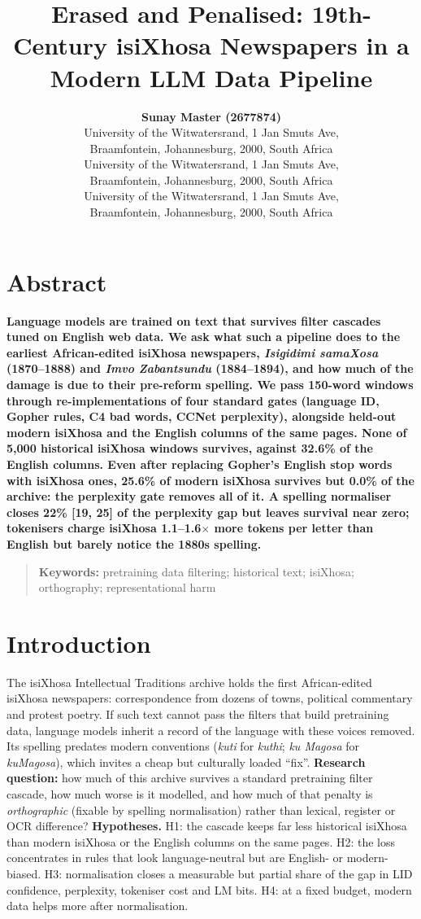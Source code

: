 \documentclass[10pt,letterpaper]{article}
\title{Erased and Penalised: 19th-Century isiXhosa Newspapers in a Modern LLM Data Pipeline}
\author{{\large \bf Sunay Master (2677874)} \\ University of the Witwatersrand, 1 Jan Smuts Ave,\\ Braamfontein, Johannesburg, 2000, South Africa
  \AND {\large \bf Matthew Purkiss (2697424)} \\ University of the Witwatersrand, 1 Jan Smuts Ave,\\ Braamfontein, Johannesburg, 2000, South Africa
  \AND {\large \bf Harshil Vallabh (2656158)} \\ University of the Witwatersrand, 1 Jan Smuts Ave,\\ Braamfontein, Johannesburg, 2000, South Africa}
\begin{document}
\maketitle
\phantom{.}
\newpage
\phantom{.}
\newpage

\section{Abstract}
{
\bf
{}
Language models are trained on text that survives filter cascades tuned on English web data. We ask what such a pipeline does to the earliest African-edited isiXhosa newspapers, \emph{Isigidimi samaXosa} (1870--1888) and \emph{Imvo Zabantsundu} (1884--1894), and how much of the damage is due to their pre-reform spelling. We pass 150-word windows through re-implementations of four standard gates (language ID, Gopher rules, C4 bad words, CCNet perplexity), alongside held-out modern isiXhosa and the English columns of the same pages. None of 5{,}000 historical isiXhosa windows survives, against 32.6\% of the English columns. Even after replacing Gopher's English stop words with isiXhosa ones, 25.6\% of modern isiXhosa survives but 0.0\% of the archive: the perplexity gate removes all of it. A spelling normaliser closes 22\% [19, 25] of the perplexity gap but leaves survival near zero; tokenisers charge isiXhosa 1.1--1.6$\times$ more tokens per letter than English but barely notice the 1880s spelling.
}
\begin{quote}
\small
\textbf{Keywords:}
pretraining data filtering; historical text; isiXhosa; orthography; representational harm
\end{quote}

\section{Introduction} \label{Intro}
The isiXhosa Intellectual Traditions archive \citep{schoots2023archive} holds the first African-edited isiXhosa newspapers: correspondence from dozens of towns, political commentary and protest poetry. If such text cannot pass the filters that build pretraining data, language models inherit a record of the language with these voices removed. Its spelling predates modern conventions (\emph{kuti} for \emph{kuthi}; \emph{ku Magosa} for \emph{kuMagosa}), which invites a cheap but culturally loaded ``fix''. \textbf{Research question:} how much of this archive survives a standard pretraining filter cascade, how much worse is it modelled, and how much of that penalty is \emph{orthographic} (fixable by spelling normalisation) rather than lexical, register or OCR difference? \textbf{Hypotheses.} H1: the cascade keeps far less historical isiXhosa than modern isiXhosa or the English columns on the same pages. H2: the loss concentrates in rules that look language-neutral but are English- or modern-biased. H3: normalisation closes a measurable but partial share of the gap in LID confidence, perplexity, tokeniser cost and LM bits. H4: at a fixed budget, modern data helps more after normalisation.
\end{document}
